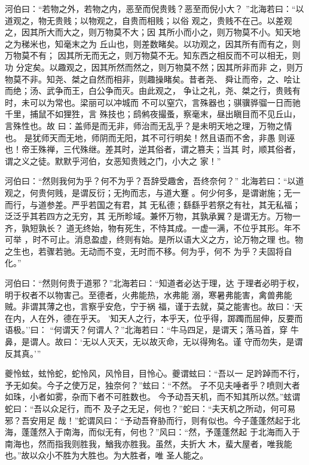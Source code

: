 \documentclass[]{article}
\begin{document}
河伯曰：``若物之外，若物之内，恶至而倪贵贱？恶至而倪小大？
''北海若曰：``以道观之，物无贵贱；以物观之，自贵而相贱；以俗
观之，贵贱不在己。以差观之，因其所大而大之，则万物莫不大；因
其所小而小之，则万物莫不小。知天地之为稊米也，知毫末之为
丘山也，则差数睹矣。以功观之，因其所有而有之，则万物莫不有；
因其所无而无之，则万物莫不无。知东西之相反而不可以相无，则功
分定矣。以趣观之，因其所然而然之，则万物莫不然；因其所非而非
之，则万物莫不非。知尧、桀之自然而相非，则趣操睹矣。昔者尧、
舜让而帝，之、哙让而绝；汤、武争而王，白公争而灭。由此观之，
争让之礼，尧、桀之行，贵贱有时，未可以为常也。梁丽可以冲城而
不可以窒穴，言殊器也；骐骥骅骝一日而驰千里，捕鼠不如狸狌，言
殊技也；鸱鸺夜撮蚤，察毫末，昼出瞋目而不见丘山，言殊性也。故
曰：盖师是而无非，师治而无乱乎？是未明天地之理，万物之情也。
是犹师天而无地，师阴而无阳，其不可行明矣！然且语而不舍，非愚
则诬也！帝王殊禅，三代殊继。差其时，逆其俗者，谓之篡夫；当其
时，顺其俗者，谓之义之徒。默默乎河伯，女恶知贵贱之门，小大之 家！''

河伯曰：``然则我何为乎？何不为乎？吾辞受趣舍，吾终奈何？''
北海若曰：``以道观之，何贵何贱，是谓反衍；无拘而志，与道大蹇
。何少何多，是谓谢施；无一而行，与道参差。严乎若国之有君，其
无私德；繇繇乎若祭之有社，其无私福；泛泛乎其若四方之无穷，其
无所畛域。兼怀万物，其孰承翼？是谓无方。万物一齐，孰短孰长？
道无终始，物有死生，不恃其成。一虚一满，不位乎其形。年不可举
，时不可止。消息盈虚，终则有始。是所以语大义之方，论万物之理
也。物之生也，若骤若驰。无动而不变，无时而不移。何为乎，何不
为乎？夫固将自化。''

河伯曰：``然则何贵于道邪？''北海若曰：``知道者必达于理，达
于理者必明于权，明于权者不以物害己。至德者，火弗能热，水弗能
溺，寒暑弗能害，禽兽弗能贼。非谓其薄之也，言察乎安危，宁于祸
福，谨于去就，莫之能害也。故曰：`天在内，人在外，德在乎天。
'知天人之行，本乎天，位乎得，踯躅而屈伸，反要而语极。''曰：
``何谓天？何谓人？''北海若曰：``牛马四足，是谓天；落马首，穿
牛鼻，是谓人。故曰：`无以人灭天，无以故灭命，无以得殉名。谨
守而勿失，是谓反其真。'''

夔怜蚿，蚿怜蛇，蛇怜风，风怜目，目怜心。夔谓蚿曰：``吾以一
足趻踔而不行，予无如矣。今子之使万足，独奈何？''蚿曰：``不然。
子不见夫唾者乎？喷则大者如珠，小者如雾，杂而下者不可胜数也。
今予动吾天机，而不知其所以然。''蚿谓蛇曰：``吾以众足行，而不
及子之无足，何也？''蛇曰：``夫天机之所动，何可易邪？吾安用足
哉！''蛇谓风曰：``予动吾脊胁而行，则有似也。今子蓬蓬然起于北
海，蓬蓬然入于南海，而似无有，何也？''风曰：``然，予蓬蓬然起
于北海而入于南海也，然而指我则胜我，鰌我亦胜我。虽然，夫折大
木，蜚大屋者，唯我能也。''故以众小不胜为大胜也。为大胜者，唯 圣人能之。
\end{document}
